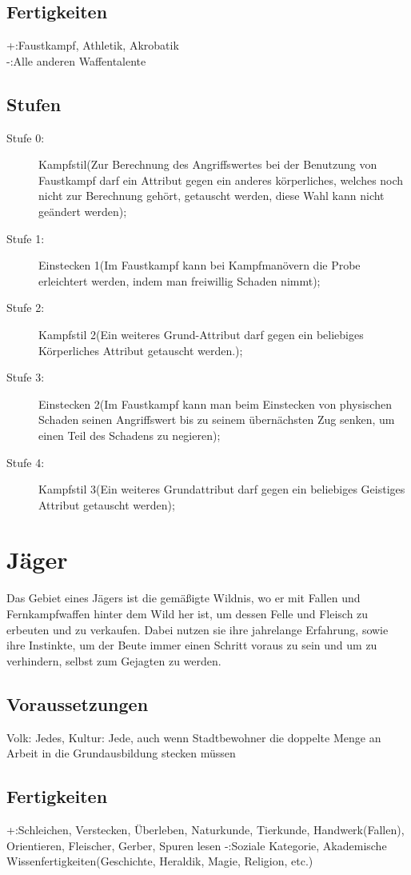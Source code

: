 \documentclass[a4paper,12pt,oneside]{book}
\begin{document}
\subsection{Fertigkeiten}
+:Faustkampf, Athletik, Akrobatik
\\-:Alle anderen Waffentalente 
\subsection{Stufen}
\begin{description}
\item[Stufe 0:]Kampfstil(Zur Berechnung des Angriffswertes bei der Benutzung von Faustkampf darf ein Attribut gegen ein anderes körperliches, welches noch nicht zur Berechnung gehört, getauscht werden, diese Wahl kann nicht geändert werden); 
\item[Stufe 1:]Einstecken 1(Im Faustkampf kann bei Kampfmanövern die Probe erleichtert werden, indem man freiwillig Schaden nimmt);
\item[Stufe 2:]Kampfstil 2(Ein weiteres Grund-Attribut darf gegen ein beliebiges Körperliches Attribut getauscht werden.);
\item[Stufe 3:]Einstecken 2(Im Faustkampf kann man beim Einstecken von physischen Schaden seinen Angriffswert bis zu seinem übernächsten Zug senken, um einen Teil des Schadens zu negieren);
\item[Stufe 4:]Kampfstil 3(Ein weiteres Grundattribut darf gegen ein beliebiges Geistiges Attribut getauscht werden);
\end{description}

\section{Jäger}
Das Gebiet eines Jägers ist die gemäßigte Wildnis, wo er mit Fallen und Fernkampfwaffen hinter dem Wild her ist, um dessen Felle und Fleisch zu erbeuten und zu verkaufen. Dabei nutzen sie ihre jahrelange Erfahrung, sowie ihre Instinkte, um der Beute immer einen Schritt voraus zu sein und um zu verhindern, selbst zum Gejagten zu werden.
\subsection{Voraussetzungen}
Volk: Jedes, Kultur: Jede, auch wenn Stadtbewohner die doppelte Menge an Arbeit in die Grundausbildung stecken müssen
\subsection{Fertigkeiten}
+:Schleichen, Verstecken, Überleben, Naturkunde, Tierkunde, Handwerk(Fallen), Orientieren, Fleischer, Gerber, Spuren lesen
-:Soziale Kategorie, Akademische Wissenfertigkeiten(Geschichte, Heraldik, Magie, Religion, etc.)
\end{document}
